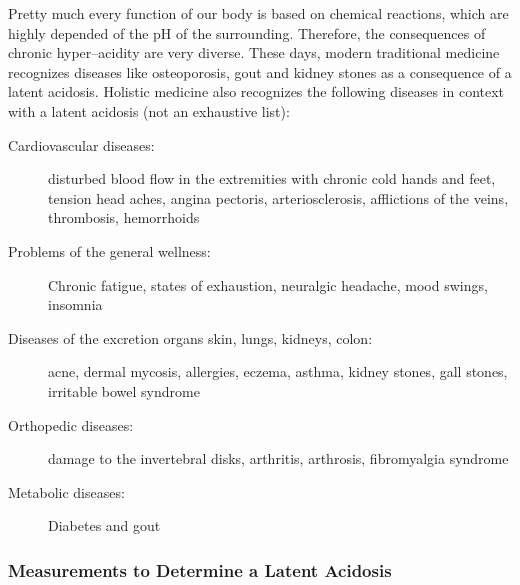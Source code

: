 \documentclass[../main.tex]{subfiles}
\begin{document}
  Pretty much every function of our body is based on chemical reactions, which are highly depended of the pH of the surrounding.
  Therefore, the consequences of chronic hyper--acidity are very diverse.
  These days, modern traditional medicine recognizes diseases like osteoporosis, gout and kidney stones
  as a consequence of a latent acidosis.
  Holistic medicine also recognizes the following diseases in context with a latent acidosis (not an exhaustive list):
  \begin{description}
  \item[Cardiovascular diseases:] disturbed blood flow in the extremities with chronic cold hands and feet,
    tension head aches, angina pectoris, arteriosclerosis,
    afflictions of the veins, thrombosis, hemorrhoids
  \item[Problems of the general wellness:] Chronic fatigue, states of exhaustion,
    neuralgic headache, mood swings, insomnia
  \item[Diseases of the excretion organs skin, lungs, kidneys, colon:] acne, dermal mycosis,
    allergies, eczema, asthma, kidney stones, gall stones,
    irritable bowel syndrome
  \item[Orthopedic diseases:] damage to the invertebral disks, arthritis, arthrosis,
    fibromyalgia syndrome
  \item[Metabolic diseases:] Diabetes and gout
  \end{description}

  \subsubsection{Measurements to Determine a Latent Acidosis}
\end{document}
